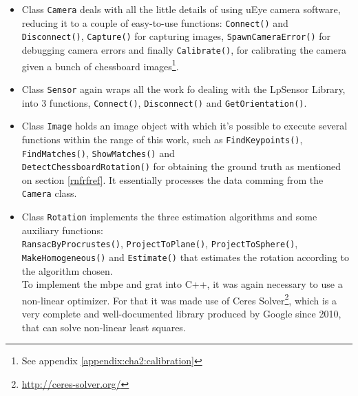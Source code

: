 \begin{itemize}
	\item Class \texttt{Camera} deals with all the little details of using uEye camera software, reducing it to a couple of easy-to-use functions: \texttt{Connect()} and \texttt{Disconnect()}, \texttt{Capture()} for capturing images, \texttt{SpawnCameraError()} for debugging camera errors and finally \texttt{Calibrate()}, for calibrating the camera given a bunch of chessboard images\footnote{See appendix \ref{appendix:cha2:calibration}}.
	
	\item Class \texttt{Sensor} again wraps all the work fo dealing with the LpSensor Library, into 3 functions, \texttt{Connect()}, \texttt{Disconnect()} and \texttt{GetOrientation()}.
	
	\item Class \texttt{Image} holds an image object with which it's possible to execute several functions within the range of this work, such as \texttt{FindKeypoints()}, \texttt{FindMatches()}, \texttt{ShowMatches()} and \\
	\texttt{DetectChessboardRotation()} for obtaining the ground truth as mentioned on section \ref{rnfrfref}. It essentially processes the data comming from the \texttt{Camera} class.
	
	\item Class \texttt{Rotation} implements the three estimation algorithms and some auxiliary functions:\\ \texttt{RansacByProcrustes()},  \texttt{ProjectToPlane()}, \texttt{ProjectToSphere()}, \texttt{MakeHomogeneous()} and \texttt{Estimate()} that estimates the rotation according to the algorithm chosen.\\
	To implement the \acrshort{mbpe} and \acrshort{grat} into C++, it was again necessary to use a non-linear optimizer. For that it was made use of Ceres Solver\footnote{\href{http://ceres-solver.org/}{http://ceres-solver.org/}}, which is a very complete and well-documented library produced by Google since 2010, that can solve non-linear least squares.
	
\end{itemize}




















